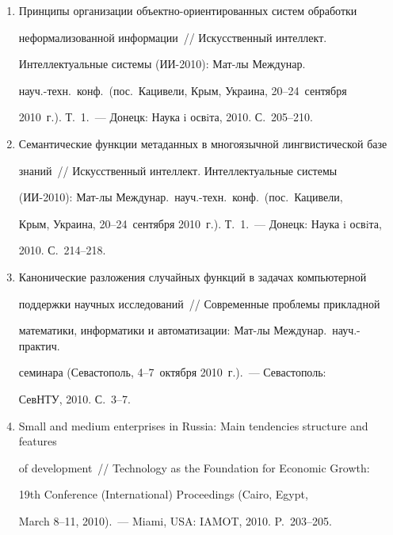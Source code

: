 \begin{enumerate}[1.]
со\-вре\-мен\-ности: Мат-лы Междунар.\ конф.\ (Гомель, Беларусь, 6--8~апреля 2010~г.).~--- 


М.: РГБ, 2010. С.~8--16.


\item {}


Принципы организации объект\-но-ориентированных сис\-тем обработки 


неформализованной информации~/\!\!/  Искусственный интеллект. 


Интеллектуальные сис\-те\-мы (ИИ-2010): Мат-лы Междунар.\ 


науч.-техн.\ конф.\ (пос.~Кацивели, Крым, Украина, 20--24~сентября 


2010~г.). Т.~1.~--- Донецк: Наука i освiта, 2010. С.~205--210.


\item {}


Семантические функции метаданных в многоязычной лингвистической базе 


знаний~/\!\!/  Искусственный интеллект. Интеллектуальные сис\-темы 


(ИИ-2010): Мат-лы Междунар.\ науч.-техн.\ конф.\ (пос.~Кацивели, 


Крым, Украина, 20--24~сентября 2010~г.). Т.~1.~--- Донецк: Наука i освiта, 


2010. С.~214--218.


\item {}


Канонические разложения случайных функций в задачах компьютерной 


поддержки научных исследований~/\!\!/  Современные проблемы прикладной 


математики, информатики и автоматизации: Мат-лы Междунар.\ науч.-практич.\ 


семинара (Севастополь, 4--7~октября 2010~г.).~--- Севастополь: 


СевНТУ, 2010. С.~3--7.


\item {}


Small and medium enterprises in Russia: Main tendencies structure and features 


of development~/\!\!/  Technology as the Foundation for Economic Growth:  


19th Conference (International) Proceedings (Cairo, Egypt,


 March 8--11, 2010).~--- Miami, USA: IAMOT, 2010. P.~203--205.



\end{enumerate}
